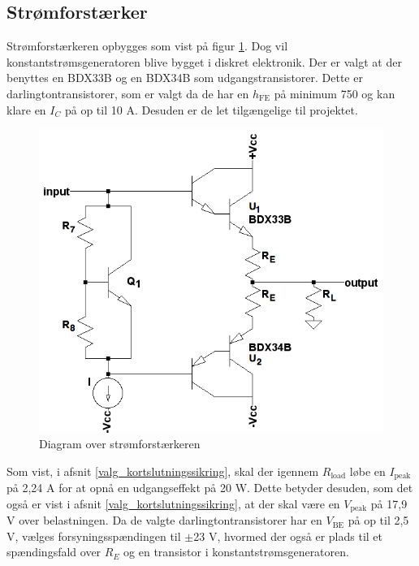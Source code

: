\subsection{Strømforstærker}
\label{effekt_stroemforstaerker}
Strømforstærkeren opbygges som vist på figur \ref{fig:blokdiagram-stroem}. Dog vil konstantstrømsgeneratoren blive bygget i diskret elektronik. Der er valgt at der benyttes en BDX33B og en BDX34B  som udgangstransistorer. Dette er darlingtontransistorer, som er valgt da de har en $h_{\mathrm{FE}}$ på minimum 750 og kan klare en $I_C$ på op til 10 A. Desuden er de let tilgængelige til projektet.

\begin{figure}[h]
\centering
\includegraphics[scale=0.4]{teknisk/effektforstaerker/blokdiagram-stroemforstaerker.png}
\caption{Diagram over strømforstærkeren}
\label{fig:blokdiagram-stroem}
\end{figure}

Som vist, i afsnit \ref{valg_kortslutningssikring}, skal der igennem $R_{\mathrm{load}}$ løbe en $I_{\mathrm{peak}}$ på 2,24 A for at opnå en udgangseffekt på 20 W. Dette betyder desuden, som det også er vist i afsnit \ref{valg_kortslutningssikring}, at der skal være en $V_{\mathrm{peak}}$ på 17,9 V over belastningen. Da de valgte darlingtontransistorer har en $V_{\mathrm{BE}}$ på op til 2,5 V, vælges forsyningsspændingen til $\pm$23 V, hvormed der også er plads til et spændingsfald over $R_E$ og en transistor i konstantstrømsgeneratoren.

